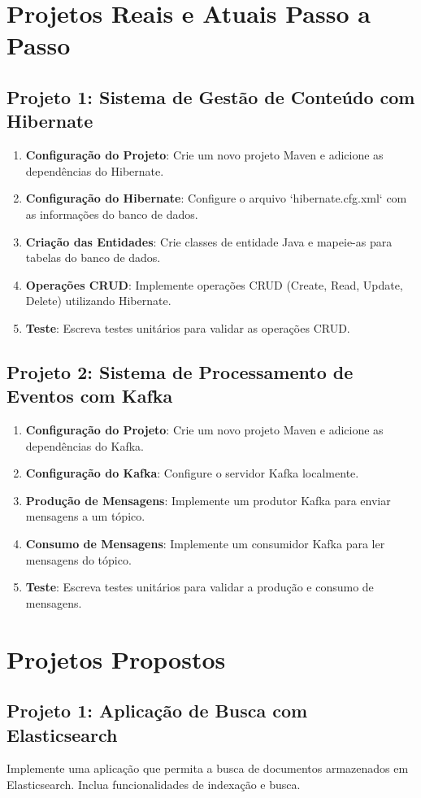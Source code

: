\documentclass[a4paper,12pt]{book}
\begin{document}
\section{Projetos Reais e Atuais Passo a Passo}
\subsection{Projeto 1: Sistema de Gestão de Conteúdo com Hibernate}
\begin{enumerate}
  \item \textbf{Configuração do Projeto}: Crie um novo projeto Maven e adicione as dependências do Hibernate.
  \item \textbf{Configuração do Hibernate}: Configure o arquivo `hibernate.cfg.xml` com as informações do banco de dados.
  \item \textbf{Criação das Entidades}: Crie classes de entidade Java e mapeie-as para tabelas do banco de dados.
  \item \textbf{Operações CRUD}: Implemente operações CRUD (Create, Read, Update, Delete) utilizando Hibernate.
  \item \textbf{Teste}: Escreva testes unitários para validar as operações CRUD.
\end{enumerate}

\subsection{Projeto 2: Sistema de Processamento de Eventos com Kafka}
\begin{enumerate}
  \item \textbf{Configuração do Projeto}: Crie um novo projeto Maven e adicione as dependências do Kafka.
  \item \textbf{Configuração do Kafka}: Configure o servidor Kafka localmente.
  \item \textbf{Produção de Mensagens}: Implemente um produtor Kafka para enviar mensagens a um tópico.
  \item \textbf{Consumo de Mensagens}: Implemente um consumidor Kafka para ler mensagens do tópico.
  \item \textbf{Teste}: Escreva testes unitários para validar a produção e consumo de mensagens.
\end{enumerate}

\section{Projetos Propostos}
\subsection{Projeto 1: Aplicação de Busca com Elasticsearch}
Implemente uma aplicação que permita a busca de documentos armazenados em Elasticsearch. Inclua funcionalidades de indexação e busca.
\end{document}
